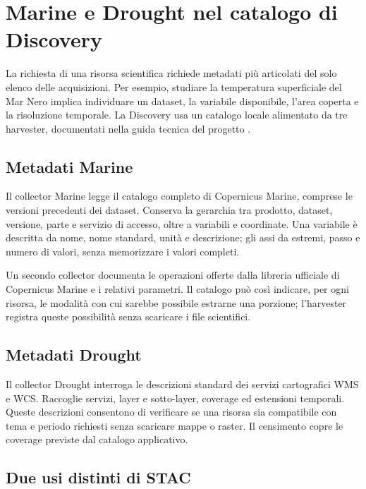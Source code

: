 \section{Marine e Drought nel catalogo di Discovery}
\label{sec:fonti-discovery}

La richiesta di una risorsa scientifica richiede metadati più articolati del
solo elenco delle acquisizioni. Per esempio, studiare la temperatura
superficiale del Mar Nero implica individuare un dataset, la variabile
disponibile, l'area coperta e la risoluzione temporale. La Discovery usa un
catalogo locale alimentato da tre harvester, documentati nella guida tecnica
del progetto \cite{guidaProgetto2026}.

\subsection{Metadati Marine}

Il collector Marine legge il catalogo completo di Copernicus Marine, comprese
le versioni precedenti dei dataset. Conserva la gerarchia tra prodotto,
dataset, versione, parte e servizio di accesso, oltre a variabili e coordinate.
Una variabile è descritta da nome, nome standard, unità e descrizione; gli assi
da estremi, passo e numero di valori, senza memorizzare i valori completi.

Un secondo collector documenta le operazioni offerte dalla libreria ufficiale
di Copernicus Marine e i relativi parametri. Il catalogo può così indicare,
per ogni risorsa, le modalità con cui sarebbe possibile estrarne una porzione;
l'harvester registra queste possibilità senza scaricare i file
scientifici.

\subsection{Metadati Drought}

Il collector Drought interroga le descrizioni standard dei servizi cartografici
WMS e WCS. Raccoglie servizi, layer e sotto-layer, coverage ed estensioni
temporali. Queste descrizioni consentono di verificare se una risorsa sia
compatibile con tema e periodo richiesti senza scaricare mappe o raster. Il
censimento copre le coverage previste dal catalogo applicativo.

\subsection{Due usi distinti di STAC}

